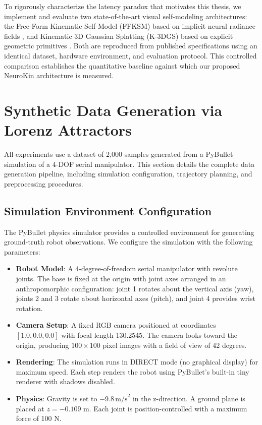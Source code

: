 \documentclass[12pt,a4paper,oneside]{report}
\begin{document}
To rigorously characterize the latency paradox that motivates this thesis, we implement and evaluate two state-of-the-art visual self-modeling architectures: the Free-Form Kinematic Self-Model (FFKSM) based on implicit neural radiance fields \cite{hu2024teaching}, and Kinematic 3D Gaussian Splatting (K-3DGS) based on explicit geometric primitives \cite{hu2025learning}. Both are reproduced from published specifications using an identical dataset, hardware environment, and evaluation protocol. This controlled comparison establishes the quantitative baseline against which our proposed NeuroKin architecture is measured.

\section{Synthetic Data Generation via Lorenz Attractors}

All experiments use a dataset of 2,000 samples generated from a PyBullet simulation of a 4-DOF serial manipulator. This section details the complete data generation pipeline, including simulation configuration, trajectory planning, and preprocessing procedures.

\subsection{Simulation Environment Configuration}

The PyBullet physics simulator provides a controlled environment for generating ground-truth robot observations. We configure the simulation with the following parameters:

\begin{itemize}
    \item \textbf{Robot Model}: A 4-degree-of-freedom serial manipulator with revolute joints. The base is fixed at the origin with joint axes arranged in an anthropomorphic configuration: joint 1 rotates about the vertical axis (yaw), joints 2 and 3 rotate about horizontal axes (pitch), and joint 4 provides wrist rotation.
    \item \textbf{Camera Setup}: A fixed RGB camera positioned at coordinates $[1.0, 0.0, 0.0]$ with focal length 130.2545. The camera looks toward the origin, producing $100 \times 100$ pixel images with a field of view of 42 degrees.
    \item \textbf{Rendering}: The simulation runs in DIRECT mode (no graphical display) for maximum speed. Each step renders the robot using PyBullet's built-in tiny renderer with shadows disabled.
    \item \textbf{Physics}: Gravity is set to $-9.8 \, \text{m/s}^2$ in the z-direction. A ground plane is placed at $z = -0.109$ m. Each joint is position-controlled with a maximum force of 100 N.
\end{itemize}
\end{document}
